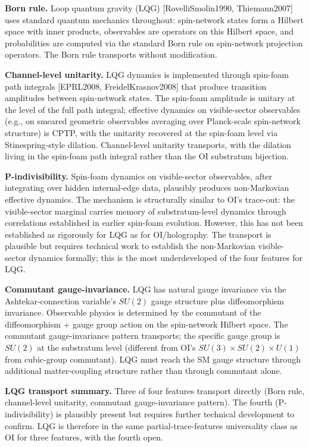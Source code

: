 \documentclass[
]{article}
\begin{document}
\textbf{Born rule.} Loop quantum gravity (LQG) {[}RovelliSmolin1990,
Thiemann2007{]} uses standard quantum mechanics throughout: spin-network
states form a Hilbert space with inner products, observables are
operators on this Hilbert space, and probabilities are computed via the
standard Born rule on spin-network projection operators. The Born rule
transports without modification.

\textbf{Channel-level unitarity.} LQG dynamics is implemented through
spin-foam path integrals {[}EPRL2008, FreidelKrasnov2008{]} that produce
transition amplitudes between spin-network states. The spin-foam
amplitude is unitary at the level of the full path integral; effective
dynamics on visible-sector observables (e.g., on smeared geometric
observables averaging over Planck-scale spin-network structure) is CPTP,
with the unitarity recovered at the spin-foam level via
Stinespring-style dilation. Channel-level unitarity transports, with the
dilation living in the spin-foam path integral rather than the OI
substratum bijection.

\textbf{P-indivisibility.} Spin-foam dynamics on visible-sector
observables, after integrating over hidden internal-edge data, plausibly
produces non-Markovian effective dynamics. The mechanism is structurally
similar to OI's trace-out: the visible-sector marginal carries memory of
substratum-level dynamics through correlations established in earlier
spin-foam evolution. However, this has not been established as
rigorously for LQG as for OI/holography. The transport is plausible but
requires technical work to establish the non-Markovian visible-sector
dynamics formally; this is the most underdeveloped of the four features
for LQG.

\textbf{Commutant gauge-invariance.} LQG has natural gauge invariance
via the Ashtekar-connection variable's \(SU(2)\) gauge structure plus
diffeomorphism invariance. Observable physics is determined by the
commutant of the diffeomorphism + gauge group action on the spin-network
Hilbert space. The commutant gauge-invariance pattern transports; the
specific gauge group is \(SU(2)\) at the substratum level (different
from OI's \(SU(3) \times SU(2) \times U(1)\) from cubic-group
commutant). LQG must reach the SM gauge structure through additional
matter-coupling structure rather than through commutant alone.

\textbf{LQG transport summary.} Three of four features transport
directly (Born rule, channel-level unitarity, commutant gauge-invariance
pattern). The fourth (P-indivisibility) is plausibly present but
requires further technical development to confirm. LQG is therefore in
the same partial-trace-features universality class as OI for three
features, with the fourth open.
\end{document}

